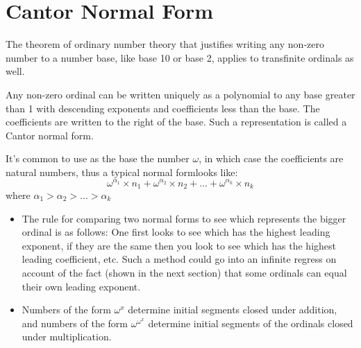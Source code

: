 \documentclass[a4paper,10pt]{article}
\begin{document}
\section{Cantor Normal Form}
   The theorem of ordinary number theory that justifies writing any non-zero number to a number base,
like base 10 or base 2, applies to transfinite ordinals as well. 
\begin{theorem}
 Any non-zero ordinal can be written uniquely as a polynomial to any base greater than 1 with descending 
exponents and coefficients less than the base. The coefficients are written to the right of the base. Such 
a representation is called a Cantor normal form. 
\end{theorem}
It's common to use as the base the number $\omega$, in which case the coefficients are natural numbers, 
thus a typical normal formlooks like:
$$\omega^{\alpha_{1}} \times n_{1} + \omega^{\alpha_{2}} \times n_{2} + ... + \omega^{\alpha_{k}} \times n_{k}$$
where 
$\alpha_{1} \gt \alpha_{2} \gt ... \gt \alpha_{k}$
\begin{itemize}
 \item The rule for comparing two normal forms to see which represents the bigger ordinal is as follows: 
One first looks to see which has the highest leading exponent, if they are the same then you look to see which
has the highest leading coefficient, etc. Such a method could go into an infinite regress on account of the fact 
(shown in the next section) that some ordinals can equal their own leading exponent. 
\item Numbers of the form $\omega^{x}$ determine initial segments closed under addition, and numbers of the form
$\omega^{\omega^{x}}$ determine initial segments of the ordinals closed under multiplication.
\end{itemize}
\end{document}
